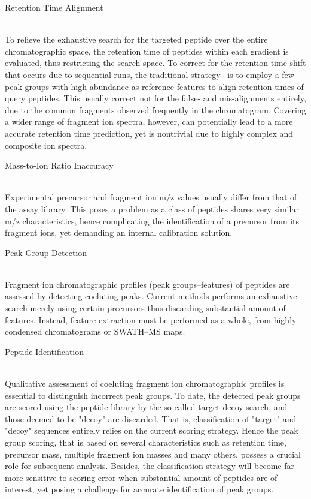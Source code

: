 \documentclass{nature}
\begin{document}
\begin{enumerate}
    
    {\bf \item Retention Time Alignment}\\
    To relieve the exhaustive search for the targeted peptide over the entire chromatographic space, the retention time of peptides within each gradient is evaluated, thus restricting the search space. To correct for the retention time shift that occurs due to sequential runs, the traditional strategy~\cite{Roest2016Tric} is to employ a few peak groups with high abundance as reference features to align retention times of query peptides. This usually correct not for the false- and mis-alignments entirely, due to the common fragments observed frequently in the chromatogram. Covering a wider range of fragment ion spectra, however, can potentially lead to a more accurate retention time prediction, yet is nontrivial due to highly complex and composite ion spectra.

    
    {\bf \item Mass-to-Ion Ratio Inaccuracy}\\
    Experimental precursor and fragment ion m/z values usually differ from that of the assay library. This poses a problem as a class of peptides shares very similar m/z characteristics, hence complicating the identification of a precursor from its fragment ions, yet demanding an internal calibration solution.
    
    {\bf \item Peak Group Detection}\\
    Fragment ion chromatographic profiles (peak groups--features) of peptides are assessed by detecting coeluting peaks. Current methods performs an exhaustive search merely using certain precursors thus discarding substantial amount of features. Instead, feature extraction must be performed as a whole, from highly condensed chromatograms or SWATH--MS maps.
    
    {\bf \item Peptide Identification}\\
    Qualitative assessment of coeluting fragment ion chromatographic profiles is essential to distinguish incorrect peak groups. To date, the detected peak groups are scored using the peptide library by the so-called target-decoy search\cite{Elias2010TargetDecoy}, and those deemed to be "decoy" are discarded. That is, classification of "target" and "decoy" sequences entirely relies on the current scoring strategy. Hence the peak group scoring, that is based on several characteristics such as retention time, precursor mass, multiple fragment ion masses and many others, possess a crucial role for subsequent analysis. Besides, the classification strategy will become far more sensitive to scoring error when substantial amount of peptides are of interest, yet posing a challenge for accurate identification of peak groups. 
    

\end{enumerate}
\end{document}

